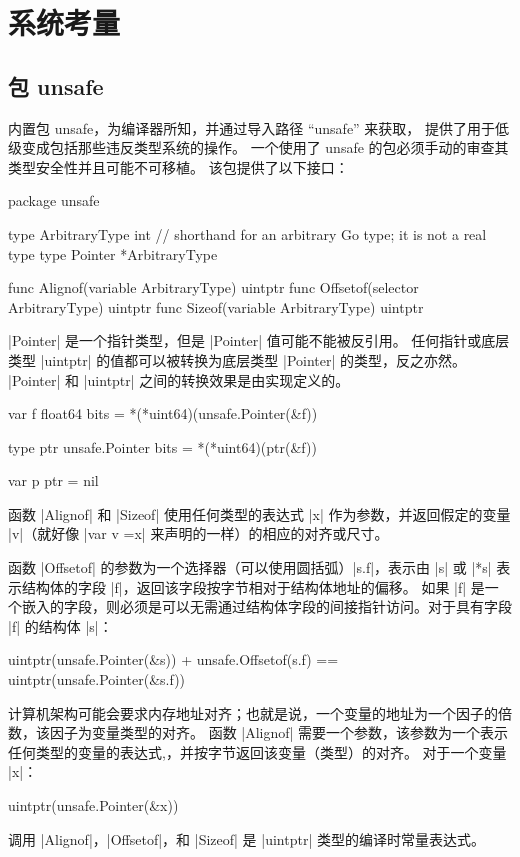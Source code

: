 \chapter{系统考量}
\section{包 unsafe}
内置包 unsafe，为编译器所知，并通过导入路径 ``unsafe'' 来获取，
提供了用于低级变成包括那些违反类型系统的操作。
一个使用了 unsafe 的包必须手动的审查其类型安全性并且可能不可移植。
该包提供了以下接口：
\begin{golang}
package unsafe

type ArbitraryType int  // shorthand for an arbitrary Go type; it is not a real type
type Pointer *ArbitraryType

func Alignof(variable ArbitraryType) uintptr
func Offsetof(selector ArbitraryType) uintptr
func Sizeof(variable ArbitraryType) uintptr
\end{golang}

\code|Pointer| 是一个指针类型，但是 \code|Pointer| 值可能不能被反引用。
任何指针或底层类型 \code|uintptr| 的值都可以被转换为底层类型 \code|Pointer| 的类型，反之亦然。
\code|Pointer| 和 \code|uintptr| 之间的转换效果是由实现定义的。
\begin{golang}
var f float64
bits = *(*uint64)(unsafe.Pointer(&f))

type ptr unsafe.Pointer
bits = *(*uint64)(ptr(&f))

var p ptr = nil
\end{golang}

函数 \code|Alignof| 和 \code|Sizeof| 使用任何类型的表达式 \code|x| 作为参数，并返回假定的变量 \code|v|（就好像 \code|var v =x| 来声明的一样）的相应的对齐或尺寸。

函数 \code|Offsetof| 的参数为一个选择器（可以使用圆括弧）\code|s.f|，表示由 \code|s| 或 \code|*s| 表示结构体的字段 \code|f|，返回该字段按字节相对于结构体地址的偏移。
如果 \code|f| 是一个嵌入的字段，则必须是可以无需通过结构体字段的间接指针访问。对于具有字段 \code|f| 的结构体 \code|s|：
\begin{golang}
uintptr(unsafe.Pointer(&s)) + unsafe.Offsetof(s.f) == uintptr(unsafe.Pointer(&s.f))
\end{golang}

计算机架构可能会要求内存地址对齐；也就是说，一个变量的地址为一个因子的倍数，该因子为变量类型的对齐。
函数 \code|Alignof| 需要一个参数，该参数为一个表示任何类型的变量的表达式,，并按字节返回该变量（类型）的对齐。
对于一个变量 \code|x|：
\begin{golang}
uintptr(unsafe.Pointer(&x)) %
\end{golang}
调用 \code|Alignof|，\code|Offsetof|，和 \code|Sizeof| 是 \code|uintptr| 类型的编译时常量表达式。

